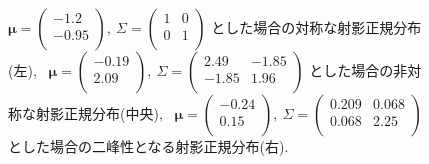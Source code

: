 \documentclass[a4j,11pt]{jarticle}
\begin{document}
\begin{figure}[H]
\begin{tabular}{c}
  \end{tabular}
\vspace{-0.5zh}
\caption[Text excluding the matrix]{
$\bm \mu = \begin{pmatrix} -1.2 \\ -0.95 \\ \end{pmatrix}, \ \Sigma = \begin{pmatrix}  1 & 0 \\ 0 & 1 \\ \end{pmatrix}$
とした場合の対称な射影正規分布(左), 
\ $\bm \mu = \begin{pmatrix} -0.19 \\ 2.09 \\ \end{pmatrix}, \ \Sigma = \begin{pmatrix} 2.49 & -1.85 \\ -1.85 & 1.96 \\ \end{pmatrix}$ とした場合の非対称な射影正規分布(中央), 
\ $\bm \mu = \begin{pmatrix} -0.24 \\ 0.15 \\ \end{pmatrix}, \ \Sigma = \begin{pmatrix} 0.209 & 0.068\\ 0.068 & 2.25 \\ \end{pmatrix}$ とした場合の二峰性となる射影正規分布(右).}
\label{sample_pn}
\end{figure}
\vspace{-0.5zh}
\end{document}
